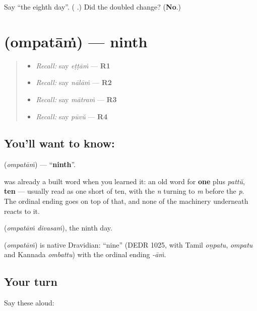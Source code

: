 \begin{tcolorbox}[breakable,colback=teal!4,colframe=teal!35!black,title={Before you move on}]
Say \textquotedblleft{}the eighth day\textquotedblright{}. (\textbf{ }.) Did the doubled  change? (\textbf{No}.)
\end{tcolorbox}
\section[\texorpdfstring{\ml{ഒമ്പതാം} (ompatāṁ)}{ഒമ്പതാം (ompatāṁ)}]{ (ompatāṁ) — ninth}

\label{lesson:ML-C68-ninth}



\begin{quote}
\begin{itemize}
\raggedright
  \item \emph{Recall:} say \emph{eṭṭāṁ} — \textbf{R1}
  \item \emph{Recall:} say \emph{nālāṁ} — \textbf{R2}
  \item \emph{Recall:} say \emph{mātraṁ} — \textbf{R3}
  \item \emph{Recall:} say \emph{pūvŭ} — \textbf{R4}
\end{itemize}
\end{quote}

\subsection*{You'll want to know: }
\textbf{} (\emph{ompatāṁ}) — \textquotedblleft{}\textbf{ninth}\textquotedblright{}.

\textbf{} was already a built word when you learned it: an old word for \textbf{one} plus \emph{pattŭ}, \textbf{ten} — usually read as one short of ten, with the \emph{n} turning to \emph{m} before the \emph{p}. The ordinal ending goes on top of that, and none of the machinery underneath reacts to it.

\textbf{ } (\emph{ompatāṁ divasaṁ}), the ninth day.

\begin{cousinweb}
\textbf{} (\emph{ompatāṁ}) is native Dravidian: \textquotedblleft{}nine\textquotedblright{} (DEDR 1025, with Tamil \emph{oṉpatu}, \emph{ompatu} and Kannada \emph{ombattu}) with the ordinal ending \emph{-āṁ}.
\end{cousinweb}

\subsection*{Your turn}
Say these aloud:

